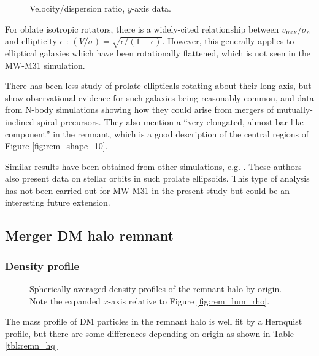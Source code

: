 \documentclass[twocolumn]{aastex63}
\begin{document}
\begin{figure}[htb!]
	\caption{Velocity/dispersion ratio, $y$-axis data.
		\label{fig:rem_st_vdisp_ratio}}
\end{figure}


For oblate isotropic rotators, there is a widely-cited relationship between $v_{\text{max}} / \sigma_c$ and ellipticity $\epsilon$ \citep{binney_rotation_1978}: $(V/\sigma) = \sqrt{\epsilon / (1 - \epsilon)}$. However, this generally applies to elliptical galaxies which have been rotationally flattened, which is not seen in the MW-M31 simulation.

There has been less study of prolate ellipticals rotating about their long axis, but \citet{tsatsi_califa_2017} show observational evidence for such galaxies being reasonably common, and data from N-body simulations showing how they could arise from mergers of mutually-inclined spiral precursors. They also mention a ``very elongated, almost bar-like component'' in the remnant, which is a good description of the central regions of Figure \ref{fig:rem_shape_10}.

Similar results have been obtained from other simulations, e.g. \citep{wang_orbit_2019}. These authors also present data on stellar orbits in such prolate ellipsoids. This type of analysis has not been carried out for MW-M31 in the present study but could be an interesting future extension.

\subsection{Merger DM halo remnant}

\subsubsection{Density profile}
\label{sec:rem_halo_mass}

\begin{figure}[htb!]
	\caption{Spherically-averaged density profiles of the remnant halo by origin. Note the expanded $x$-axis relative to Figure \ref{fig:rem_lum_rho}.
		\label{fig:rem_DM_rho}}
\end{figure}

The mass profile of DM particles in the remnant halo is well fit by a Hernquist profile, but there are some differences depending on origin as shown in Table \ref{tbl:remn_hq}
\end{document}

